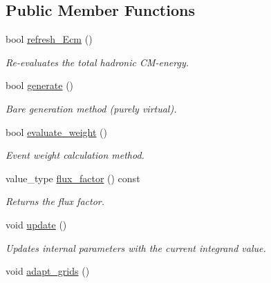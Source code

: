 \subsection*{Public Member Functions}
\begin{DoxyCompactItemize}
\item 
\hypertarget{a00261_a1b5f887e0ca08598f61e9906618b7e5b}{}bool \hyperlink{a00261_a1b5f887e0ca08598f61e9906618b7e5b}{refresh\+\_\+\+Ecm} ()\label{a00261_a1b5f887e0ca08598f61e9906618b7e5b}

\begin{DoxyCompactList}\small\item\em Re-\/evaluates the total hadronic C\+M-\/energy. \end{DoxyCompactList}\item 
bool \hyperlink{a00261_a0272f975dde2f379cb798684624c2958}{generate} ()
\begin{DoxyCompactList}\small\item\em \textquotesingle{}Bare generation\textquotesingle{} method (purely virtual). \end{DoxyCompactList}\item 
\hypertarget{a00261_a4814c8e5ff03d7e6e9d186e5cc335b68}{}bool \hyperlink{a00261_a4814c8e5ff03d7e6e9d186e5cc335b68}{evaluate\+\_\+weight} ()\label{a00261_a4814c8e5ff03d7e6e9d186e5cc335b68}

\begin{DoxyCompactList}\small\item\em Event weight calculation method. \end{DoxyCompactList}\item 
\hypertarget{a00261_a680d26d1d2fada0b42d023ab279bf876}{}value\+\_\+type \hyperlink{a00261_a680d26d1d2fada0b42d023ab279bf876}{flux\+\_\+factor} () const \label{a00261_a680d26d1d2fada0b42d023ab279bf876}

\begin{DoxyCompactList}\small\item\em Returns the flux factor. \end{DoxyCompactList}\item 
\hypertarget{a00261_a44b94112f0dd7669b1b07cd11f4294ff}{}void \hyperlink{a00261_a44b94112f0dd7669b1b07cd11f4294ff}{update} ()\label{a00261_a44b94112f0dd7669b1b07cd11f4294ff}

\begin{DoxyCompactList}\small\item\em Updates internal parameters with the current integrand value. \end{DoxyCompactList}\item 
\hypertarget{a00261_a8c1a32beb41d47305fc2c8f8e95abbab}{}void \hyperlink{a00261_a8c1a32beb41d47305fc2c8f8e95abbab}{adapt\+\_\+grids} ()\label{a00261_a8c1a32beb41d47305fc2c8f8e95abbab}


\end{DoxyCompactItemize}
